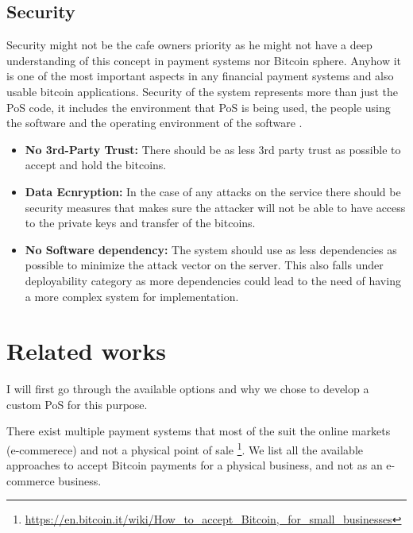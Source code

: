 \subsection{Security} Security might not be the cafe owners priority as he might not have a deep understanding of this concept in payment systems nor Bitcoin sphere. Anyhow it is one of the most important aspects in any financial payment systems and also usable bitcoin applications. Security of the system represents more than just the PoS code, it includes the environment that PoS is being used, the people using the software and the operating environment of the software \cite{securityreq}.
\begin{itemize}

\item \textbf{No 3rd-Party Trust: }There should be as less 3rd party trust as possible to accept and hold the bitcoins.

\item \textbf{Data Ecnryption: }In the case of any attacks on the service there should be security measures that makes sure the attacker will not be able to have access to the private keys and transfer of the bitcoins.

\item \textbf{No Software dependency: }The system should use as less dependencies as possible to minimize the attack vector on the server. This also falls under deployability category as more dependencies could lead to the need of having a more complex system for implementation. %

\end{itemize}

\section{Related works}
I will first go through the available options and why we chose to develop a custom PoS for this purpose.

There exist multiple payment systems that most of the suit the online markets (\eg e-commerece) and not a physical point of sale \footnote{\url{https://en.bitcoin.it/wiki/How_to_accept_Bitcoin,_for_small_businesses}}. We list all the available approaches to accept Bitcoin payments for a physical business, and not as an e-commerce business.


